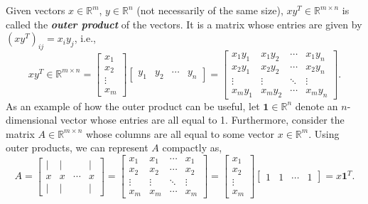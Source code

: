 \documentclass[12pt]{article}
\begin{document}
Given vectors $x \in \mathbb{R}^m$, $y \in \mathbb{R}^n$ (not necessarily 
of the same size), $x y^T \in \mathbb{R}^{m \times n}$ is called the \textbf{\textit{outer
  product}} of the vectors.  It is a matrix whose entries are given by
$(x y^T)_{ij} = x_i y_j$, i.e.,
\[ x y^T \in \mathbb{R}^{m \times n} 
= \left [ \begin{array}{c} x_1 \\ x_2 \\ \vdots \\ x_m \end{array} \right ]
\left [ \begin{array}{cccc} y_1 & y_2 & \cdots & y_n \end{array} \right ]
= \left [ \begin{array}{cccc}x_1
    y_1 & x_1 y_2 & \cdots & x_1 
    y_n \\ x_2 y_1 & x_2 y_2 & \cdots & x_2 y_n \\ \vdots & \vdots &
    \ddots & \vdots \\ x_m y_1 & x_m y_2 & \cdots & x_m y_n
    \end{array} \right ]. \]
As an example of how the outer product can be useful, let $\mathbf{1} \in \mathbb{R}^n$
denote an $n$-dimensional vector whose entries are all equal to 1.  Furthermore,
consider the matrix $A \in \mathbb{R}^{m \times n}$ whose columns are all
equal to some vector $x \in \mathbb{R}^m$.  Using outer products, we can
represent $A$ compactly as,
\[A = \left [ \begin{array}{cccc} | & | &  & 
  | \\ x & x & \cdots & x \\ | & | &  & |
  \end{array} \right ] 
= \left [ \begin{array}{cccc}x_1
    & x_1 & \cdots & x_1 
    \\ x_2 & x_2 & \cdots & x_2 \\ \vdots & \vdots &
    \ddots & \vdots \\ x_m & x_m & \cdots & x_m 
    \end{array} \right ] 
= \left [ \begin{array}{c} x_1 \\ x_2 \\ \vdots \\ x_m \end{array} \right ]
\left [ \begin{array}{cccc} 1 & 1 & \cdots & 1 \end{array} \right ]
= x \mathbf{1}^T. \]
  
\end{document}
